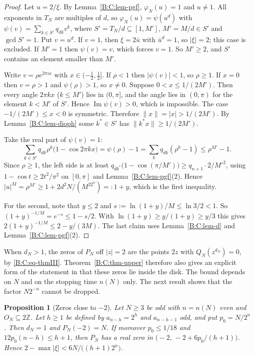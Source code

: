 \documentclass[11pt,a4paper]{article}
\newtheorem{proposition}[theorem]{Proposition}
\theoremstyle{definition}
\theoremstyle{remark}
\numberwithin{equation}{section}
\begin{document}
\begin{proof}
Let $u=2/\xi$.  By Lemma~\ref{B:C:lem-pgf}, $\varphi_N(u)=1$ and $u\ne1$.  All
exponents in $T_N$ are multiples of $d$, so $\varphi_N(u)=\psi(u^d)$ with
$\psi(v)=\sum_{k\in S'}q_{dk}v^k$, where $S'=T_N/d\subseteq[1,M']$, $M'=M/d\in S'$
and $\gcd S'=1$.  Put $v=u^d$.  If $v=1$, then $\xi=2\bar u$ with $\bar u^d=1$, so
$|\xi|=2$; this case is excluded.  If $M'=1$ then $\psi(v)=v$, which forces
$v=1$.  So $M'\ge2$, and $S'$ contains an element smaller than $M'$.

Write $v=\rho e^{2\pi ix}$ with $x\in(-\tfrac12,\tfrac12]$.  If $\rho<1$ then
$|\psi(v)|<1$, so $\rho\ge1$.  If $x=0$ then $v=\rho>1$ and $\psi(\rho)>1$, so
$x\ne0$.  Suppose $0<x\le1/(2M')$.  Then every angle $2\pi kx$ ($k\le M'$) lies in
$(0,\pi]$, and the angle lies in $(0,\pi)$ for the element $k<M'$ of $S'$.  Hence
$\operatorname{Im}\psi(v)>0$, which is impossible.  The case $-1/(2M')\le x<0$ is
symmetric.  Therefore $\|x\|=|x|>1/(2M')$.  By Lemma~\ref{B:C:lem-dioph} some
$k^*\in S'$ has $\|k^*x\|\ge1/(2M')$.

Take the real part of $\psi(v)=1$:
\[
\sum_{k\in S'}q_{dk}\rho^k\bigl(1-\cos2\pi kx\bigr)=\psi(\rho)-1
=\sum_kq_{dk}(\rho^k-1)\le\rho^{M'}-1 .
\]
Since $\rho\ge1$, the left side is at least
$q_{dk^*}\bigl(1-\cos(\pi/M')\bigr)\ge q_{n+1}\cdot2/M'^2$, using
$1-\cos t\ge2t^2/\pi^2$ on $[0,\pi]$ and Lemma~\ref{B:C:lem-pgf}(2).  Hence
$|u|^{M}=\rho^{M'}\ge1+2d^2N/(M^22^n)=:1+y$, which is the first inequality.

For the second, note that $y\le2$ and $s:=\ln(1+y)/M\le\ln3/2<1$.  So
$(1+y)^{-1/M}=e^{-s}\le1-s/2$.  With $\ln(1+y)\ge y/(1+y)\ge y/3$ this gives
$2(1+y)^{-1/M}\le2-y/(3M)$.  The last claim uses Lemma~\ref{B:C:lem-d} and
Lemma~\ref{B:C:lem-pgf}(2).
\end{proof}

When $d_N>1$, the zeros of $P_N$ off $|z|=2$ are the points $2z$ with
$Q_N(z^{d_N})=0$, by \eqref{B:C:eq-thmIII}.  Theorem~\ref{B:C:thm-upper} therefore also gives an explicit
form of the statement in \cite[Thm.~III]{R005} that these zeros lie inside
the disk.  The bound depends on $N$ and on the stopping time $n(N)$ only.  The
next result shows that the factor $N2^{-n}$ cannot be dropped.

\begin{proposition}[Zeros close to $-2$]\label{B:C:prop-sharp}
Let $N\ge3$ be odd with $n=n(N)$ even and $O_N\subseteq2\mathbb Z$.  Let $h\ge1$
be defined by $a_{n-h}=2^h$ and $a_{n-h-1}$ odd, and put $p_0=N/2^n$.  Then
$d_N=1$ and $P_N(-2)=N$.  If moreover $p_0\le1/18$ and $12p_0(n-h)\le h+1$, then
$P_N$ has a real zero in $\bigl(-2,\,-2+6p_0/(h+1)\bigr)$.  Hence
$2-\max|\xi|<6N/\bigl((h+1)2^n\bigr)$.
\end{proposition}
\end{document}
